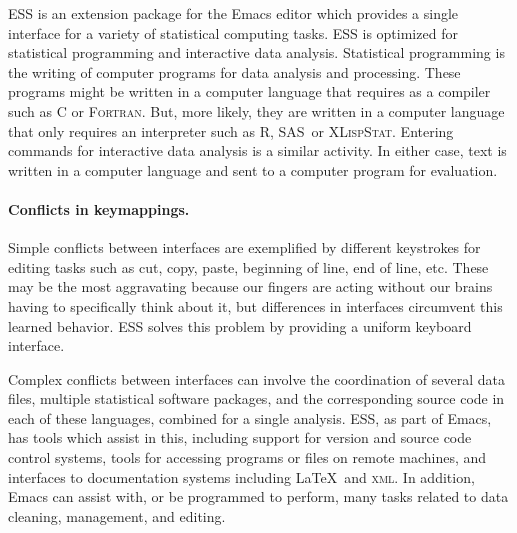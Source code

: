 \documentclass{article}
\newcommand*{\SAS}{\textsc{SAS}}
\newcommand*{\XLispStat}{\textsc{XLispStat}}
\newcommand*{\Fortran}{\textsc{Fortran}}
\begin{document}
ESS is an extension package for
the Emacs editor which provides a single interface for a variety of
statistical computing tasks.  ESS is optimized for statistical programming
and interactive data analysis.  Statistical programming is the writing of
computer programs for data analysis and processing.  These programs might be
written in a computer language that requires as a compiler such as C or
\Fortran.  But, more likely, they are written in a  computer
language that only requires an interpreter such as R, \SAS\ or \XLispStat.
Entering commands for interactive data analysis is a similar activity.
In either case, text is written in a computer language and sent to a
computer program for evaluation.

\paragraph{Conflicts in keymappings.}
\label{sec:confl-keym}

Simple conflicts between interfaces are exemplified by different
keystrokes for editing tasks such as cut, copy, paste, beginning of
line, end of line, etc.  These may be the most aggravating
because our fingers are acting without our brains having to
specifically think about it, but differences in interfaces
circumvent this learned behavior.  ESS solves this problem by
providing a uniform keyboard interface.

Complex conflicts between interfaces can involve the coordination of
several data files, multiple statistical software packages, and the
corresponding source code in each of these languages, combined for a
single analysis.  ESS, as part of Emacs, has tools which assist in
this, including support for version and source code control systems,
tools for accessing programs or files on remote machines, and
interfaces to documentation systems including \LaTeX\ and
\textsc{xml}.  In addition, Emacs can assist with, or be programmed to
perform, many tasks related to data cleaning, management, and editing.
\end{document}
